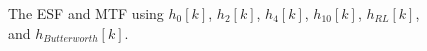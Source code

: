 \begin{figure}[h]
\begin{tabular}{ccc}
\end{tabular}
\caption{The ESF and MTF using $h_0[k]$, $h_2[k]$, $h_4[k]$, $h_{10}[k]$, $h_{RL}[k]$, and $h_{Butterworth}[k]$.} \label{fig:ESF_MTF}
\end{figure}
